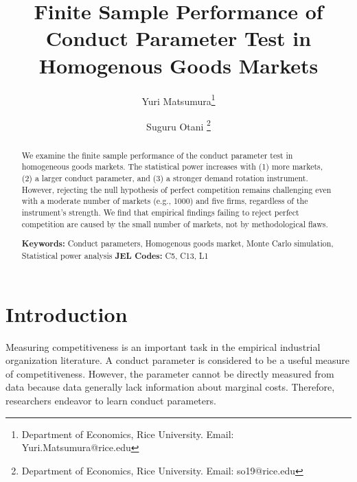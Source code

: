 \documentclass[11pt, a4paper]{article}
\title{Finite Sample Performance of Conduct Parameter Test in Homogenous Goods Markets}
\author{Yuri Matsumura\thanks{Department of Economics, Rice University. Email: Yuri.Matsumura@rice.edu} \and Suguru Otani \thanks{Department of Economics, Rice University. Email: so19@rice.edu
}}
\begin{document}
\maketitle
\begin{abstract}
    We examine the finite sample performance of the conduct parameter test in homogeneous goods markets. The statistical power increases with (1) more markets, (2) a larger conduct parameter, and (3) a stronger demand rotation instrument. However, rejecting the null hypothesis of perfect competition remains challenging even with a moderate number of markets (e.g., 1000) and five firms, regardless of the instrument's strength. We find that empirical findings failing to reject perfect competition are caused by the small number of markets, not by methodological flaws.
\vspace{0.1in}

\noindent\textbf{Keywords:} Conduct parameters, Homogenous goods market, Monte Carlo simulation, Statistical power analysis
\vspace{0in}
\newline
\noindent\textbf{JEL Codes:} C5, C13, L1

\bigskip
\end{abstract}


\section{Introduction}
Measuring competitiveness is an important task in the empirical industrial organization literature.
A conduct parameter is considered to be a useful measure of competitiveness. 
However, the parameter cannot be directly measured from data because data generally lack information about marginal costs.
Therefore, researchers endeavor to learn conduct parameters.
\end{document}
